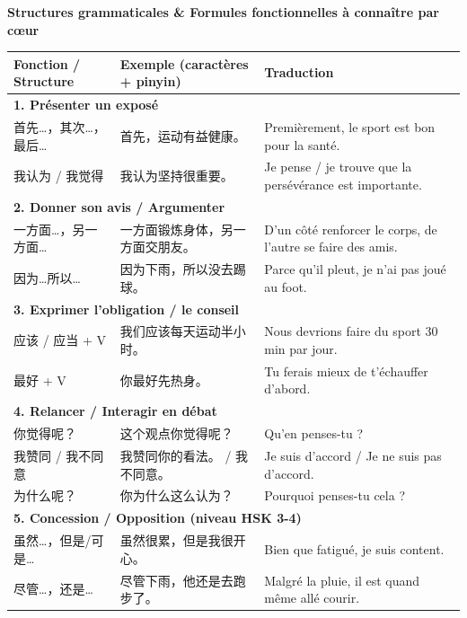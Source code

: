 \documentclass[11pt]{article}
\begin{document}
\begin{bilan}
\textbf{Structures grammaticales \& Formules fonctionnelles à connaître par cœur} \\[4pt]
\begin{center}
\begin{tabularx}{\linewidth}{|X|X|X|}
\hline
\rowcolor{poporangeL} \textbf{Fonction / Structure} & \textbf{Exemple (caractères + pinyin)} & \textbf{Traduction} \\ \hline
\multicolumn{3}{|l|}{\textbf{1. Présenter un exposé}} \\ \hline
首先…，其次…，最后… & 首先，运动有益健康。 & Premièrement, le sport est bon pour la santé. \\ \hline
我认为 / 我觉得 & 我认为坚持很重要。 & Je pense / je trouve que la persévérance est importante. \\ \hline
\multicolumn{3}{|l|}{\textbf{2. Donner son avis / Argumenter}} \\ \hline
一方面…，另一方面… & 一方面锻炼身体，另一方面交朋友。 & D'un côté renforcer le corps, de l'autre se faire des amis. \\ \hline
因为…所以… & 因为下雨，所以没去踢球。 & Parce qu'il pleut, je n'ai pas joué au foot. \\ \hline
\multicolumn{3}{|l|}{\textbf{3. Exprimer l'obligation / le conseil}} \\ \hline
应该 / 应当 + V & 我们应该每天运动半小时。 & Nous devrions faire du sport 30 min par jour. \\ \hline
最好 + V & 你最好先热身。 & Tu ferais mieux de t'échauffer d'abord. \\ \hline
\multicolumn{3}{|l|}{\textbf{4. Relancer / Interagir en débat}} \\ \hline
你觉得呢？ & 这个观点你觉得呢？ & Qu'en penses-tu ? \\ \hline
我赞同 / 我不同意 & 我赞同你的看法。 / 我不同意。 & Je suis d'accord / Je ne suis pas d'accord. \\ \hline
为什么呢？ & 你为什么这么认为？ & Pourquoi penses-tu cela ? \\ \hline
\multicolumn{3}{|l|}{\textbf{5. Concession / Opposition (niveau HSK 3-4)}} \\ \hline
虽然…，但是/可是… & 虽然很累，但是我很开心。 & Bien que fatigué, je suis content. \\ \hline
尽管…，还是… & 尽管下雨，他还是去跑步了。 & Malgré la pluie, il est quand même allé courir. \\ \hline
\end{tabularx}
\end{center}


\end{bilan}
\end{document}
